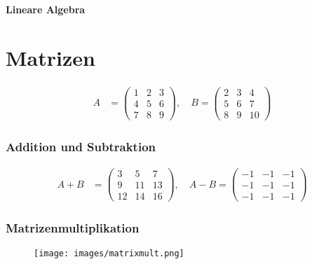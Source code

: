 \documentclass{article}
\begin{document}
\begin{center}
\textbf{\LARGE Lineare Algebra}
\end{center}

\section*{Matrizen}
\begin{minipage}[t]{0.45\textwidth}
    \begin{align*}
        A &= \begin{pmatrix}
        1 & 2 & 3 \\
        4 & 5 & 6 \\
        7 & 8 & 9
        \end{pmatrix}, \quad
        B = \begin{pmatrix}
        2 & 3 & 4 \\
        5 & 6 & 7 \\
        8 & 9 & 10
        \end{pmatrix}
    \end{align*}
    \subsubsection*{Addition und Subtraktion}
    \begin{align*}
    A + B &= \begin{pmatrix}
    3 & 5 & 7 \\
    9 & 11 & 13 \\
    12 & 14 & 16
    \end{pmatrix}, \quad
    A - B = \begin{pmatrix}
    -1 & -1 & -1 \\
    -1 & -1 & -1 \\
    -1 & -1 & -1
    \end{pmatrix}
    \end{align*}

    \subsubsection*{Matrizenmultiplikation}
    \begin{figure}[H]
        \texttt{[image: images/matrixmult.png]}
    \end{figure}
\end{minipage}
\hfill
\end{document}
